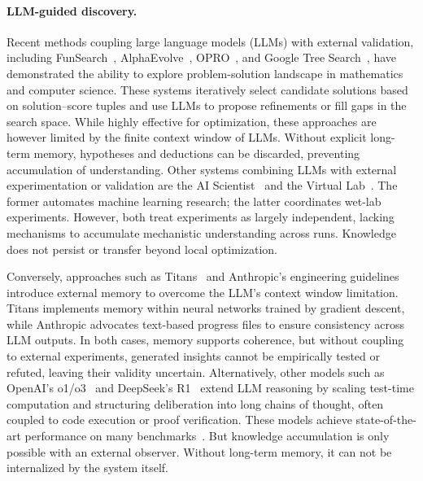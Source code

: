 \documentclass[10pt,twocolumn]{article}
\begin{document}
\paragraph{LLM-guided discovery.}
Recent methods coupling large language models (LLMs) with external validation, including FunSearch~\citep{romera-paredes_mathematical_2024}, AlphaEvolve~\citep{novikov_alphaevolve_2025}, OPRO~\citep{yang_large_2024}, and Google Tree Search~\citep{aygun_ai_2025}, have demonstrated the ability to explore problem-solution landscape in mathematics and computer science. These systems iteratively select candidate solutions based on solution--score tuples and use LLMs to propose refinements or fill gaps in the search space. While highly effective for optimization, these approaches are however limited by the finite context window of LLMs. Without explicit long-term memory, hypotheses and deductions can be discarded, preventing accumulation of understanding.
Other systems combining LLMs with external experimentation or validation are the AI Scientist~\citep{lu_ai_2024} and the Virtual Lab~\citep{swanson_virtual_2024}. The former automates machine learning research; the latter coordinates wet-lab experiments. However, both treat experiments as largely independent, lacking mechanisms to accumulate mechanistic understanding across runs. Knowledge does not persist or transfer beyond local optimization.

Conversely, approaches such as Titans~\citep{behrouz_titans_2024} and Anthropic's engineering guidelines~\citep{anthropic2025harnesses} introduce external memory to overcome the LLM's context window limitation. Titans implements memory within neural networks trained by gradient descent, while Anthropic advocates text-based progress files to ensure consistency across LLM outputs. In both cases, memory supports coherence, but without coupling to external experiments, generated insights cannot be empirically tested or refuted, leaving their validity uncertain. 
Alternatively, other models such as OpenAI’s o1/o3~\citep{openai2024reasoning, openai2025o3mini} and DeepSeek’s R1~\citep{deepseek-ai_deepseek-r1_2025} extend LLM reasoning by scaling test-time computation and structuring deliberation into long chains of thought, often coupled to code execution or proof verification. These models achieve state-of-the-art performance on many benchmarks~\citep{li_system_2025}. But knowledge accumulation is only possible with an external observer. Without long-term memory, it can not be internalized by the system itself.
\end{document}
